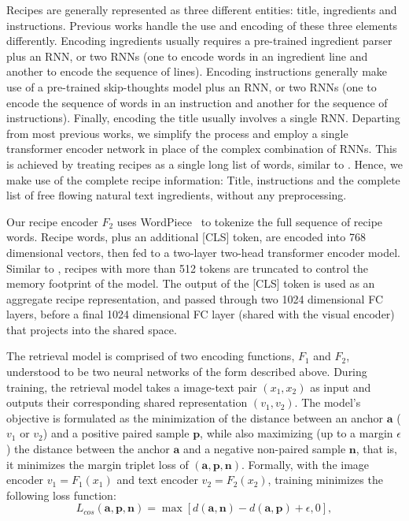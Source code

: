\documentclass[sigconf,nonacm]{acmart}
\newcommand{\anchor}{\bm{a}}
\newcommand{\positive}{\bm{p}}
\newcommand{\negative}{\bm{n}}
\begin{document}
Recipes are generally represented as three different entities: title, ingredients and instructions. Previous works handle the use and encoding of these three elements differently. Encoding ingredients usually requires a pre-trained ingredient parser plus an RNN, or two RNNs (one to encode words in an ingredient line and another to encode the sequence of lines). Encoding instructions generally make use of a pre-trained skip-thoughts model plus an RNN, or two RNNs (one to encode the sequence of words in an instruction and another for the sequence of instructions). Finally, encoding the title usually involves a single RNN. Departing from most previous works, we simplify the process and employ a single transformer encoder network \cite{Vaswani2017} in place of the complex combination of RNNs. This is achieved by treating recipes as a single long list of words, similar to \cite{Fain2019}. Hence, we make use of the complete recipe information: Title, instructions and the complete list of free flowing natural text ingredients, without any preprocessing. 

Our recipe encoder $F_2$ 
uses
WordPiece~\cite{Wu2016} to tokenize the full sequence of recipe words. Recipe words, plus an additional [CLS] token, are encoded into 768 dimensional vectors, then fed to a two-layer two-head transformer encoder model. Similar to \cite{Devlin2018}, recipes with more than 512 tokens are truncated to control the memory footprint of the model. The output of the [CLS] token is used as an aggregate recipe representation, and passed through two 1024 dimensional FC layers, before a final 1024 dimensional FC layer (shared with the visual encoder) that projects into the shared space.


The retrieval model is comprised of two encoding functions, $F_1$ and $F_2$, understood to be two neural networks of the form described above. During training, the retrieval model takes a
image-text pair $(x_1,x_2)$ as input and outputs their corresponding shared representation $(v_1,v_2)$. The model's objective is formulated as the minimization of the distance between an anchor $\anchor$ ($v_1$ or $v_2$) and a positive paired sample $\positive$, while also maximizing (up to a margin $\epsilon$) the distance between the anchor $\anchor$ and a negative non-paired sample $\negative$, that is, it minimizes the margin triplet loss of $(\anchor, \positive, \negative)$. Formally, with the image encoder $v_1 = F_1(x_1)$ and text encoder $v_2 = F_2(x_2)$, 
training minimizes the following loss function:
\begin{equation}
    L_{cos}(\anchor, \positive, \negative) =  \max\left[  d{\left(\anchor, \negative \right)} - d{\left(\anchor, \positive \right)} + \epsilon, 0 \right] ,
    \label{eq:loss}
\end{equation}
\end{document}
